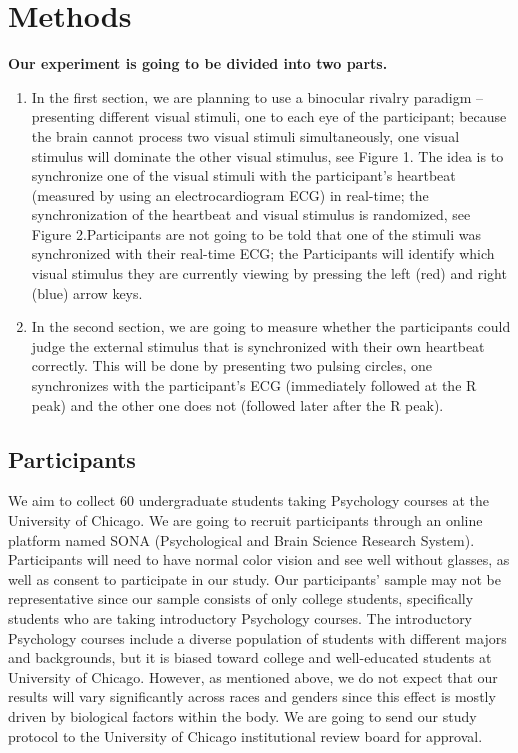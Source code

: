 \documentclass[
  man]{apa6}
\begin{document}
\hypertarget{methods}{%
\section{Methods}\label{methods}}

\textbf{Our experiment is going to be divided into two parts.}

\begin{enumerate}
\def\labelenumi{\arabic{enumi}.}
\item
  In the first section, we are planning to use a binocular rivalry paradigm -- presenting different visual stimuli, one to each eye of the participant; because the brain cannot process two visual stimuli simultaneously, one visual stimulus will dominate the other visual stimulus, see Figure 1. The idea is to synchronize one of the visual stimuli with the participant's heartbeat (measured by using an electrocardiogram ECG) in real-time; the synchronization of the heartbeat and visual stimulus is randomized, see Figure 2.Participants are not going to be told that one of the stimuli was synchronized with their real-time ECG; the Participants will identify which visual stimulus they are currently viewing by pressing the left (red) and right (blue) arrow keys.
\item
  In the second section, we are going to measure whether the participants could judge the external stimulus that is synchronized with their own heartbeat correctly. This will be done by presenting two pulsing circles, one synchronizes with the participant's ECG (immediately followed at the R peak) and the other one does not (followed later after the R peak).
\end{enumerate}

\hypertarget{participants}{%
\subsection{Participants}\label{participants}}

We aim to collect 60 undergraduate students taking Psychology courses at the University of Chicago. We are going to recruit participants through an online platform named SONA (Psychological and Brain Science Research System). Participants will need to have normal color vision and see well without glasses, as well as consent to participate in our study. Our participants' sample may not be representative since our sample consists of only college students, specifically students who are taking introductory Psychology courses. The introductory Psychology courses include a diverse population of students with different majors and backgrounds, but it is biased toward college and well-educated students at University of Chicago. However, as mentioned above, we do not expect that our results will vary significantly across races and genders since this effect is mostly driven by biological factors within the body. We are going to send our study protocol to the University of Chicago institutional review board for approval.
\end{document}
